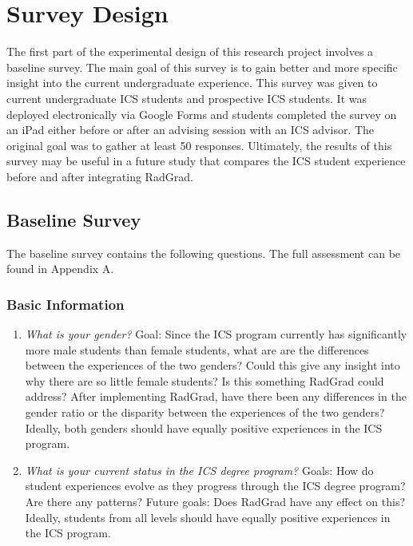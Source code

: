 \chapter{Survey Design}
\label{surveyDesign}
The first part of the experimental design of this research project involves a baseline survey. The main goal of this survey is to gain better and more specific insight into the current undergraduate experience. This survey was given to current undergraduate ICS students and prospective ICS students. It was deployed electronically via Google Forms and students completed the survey on an iPad either before or after an advising session with an ICS advisor.  The original goal was to gather at least 50 responses. Ultimately, the results of this survey may be useful in a future study that compares the ICS student experience before and after integrating RadGrad. 
\section{Baseline Survey}
\label{baselineSurvey}
	The baseline survey contains the following questions. The full assessment can be found in Appendix A. 

\subsection{Basic Information}
\begin{enumerate}
\item \textit{What is your gender? }
Goal: Since the ICS program currently has significantly more male students than female students, what are are the differences between the experiences of the two genders? Could this give any insight into why there are so little female students? Is this something RadGrad could address? After implementing RadGrad, have there been any differences in the gender ratio or the disparity between the experiences of the two genders? Ideally, both genders should have equally positive experiences in the ICS program.
\item \textit{What is your current status in the ICS degree program?}
Goals: How do student experiences evolve as they progress through the ICS degree program? Are there any patterns? Future goals: Does RadGrad have any effect on this? Ideally, students from all levels should have equally positive experiences in the ICS program. 
\end{enumerate}

